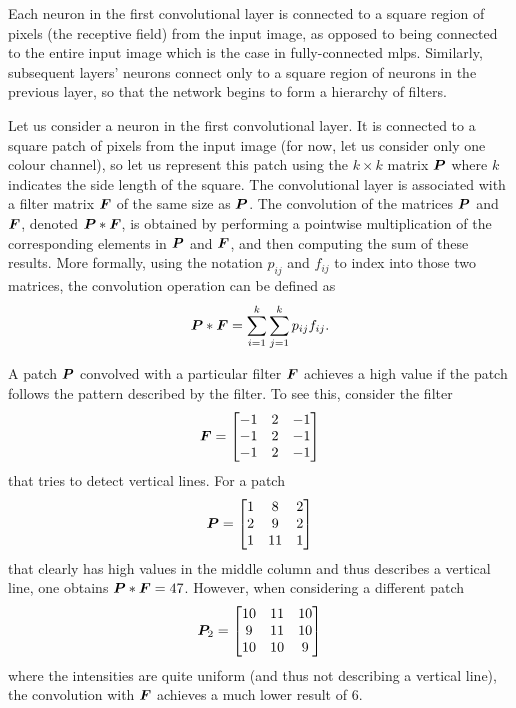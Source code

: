 \documentclass[../report.tex]{subfiles}
\begin{document}
Each neuron in the first convolutional layer is connected to a square region of pixels (the receptive field) from the input image, as opposed to being connected to the entire input image which is the case in fully-connected \glspl{mlp}.
Similarly, subsequent layers' neurons connect only to a square region of neurons in the previous layer, so that the network begins to form a hierarchy of filters.

Let us consider a neuron in the first convolutional layer.
It is connected to a square patch of pixels from the input image (for now, let us consider only one colour channel), so let us represent this patch using the $k\times k$ matrix ${\bm{P}}$ where $k$ indicates the side length of the square.
The convolutional layer is associated with a filter matrix ${\bm{F}}$ of the same size as ${\bm{P}}$.
The convolution of the matrices ${\bm{P}}$ and ${\bm{F}}$, denoted ${\bm{P}} * {\bm{F}}$, is obtained by performing a pointwise multiplication of the corresponding elements in ${\bm{P}}$ and ${\bm{F}}$, and then computing the sum of these results.
More formally, using the notation $p_{ij}$ and $f_{ij}$ to index into those two matrices, the convolution operation can be defined as
\begin{equation}
    {\bm{P}} * {\bm{F}} = \sum_{i=1}^k \sum_{j=1}^k p_{ij} f_{ij}.
\end{equation}

A patch ${\bm{P}}$ convolved with a particular filter ${\bm{F}}$ achieves a high value if the patch follows the pattern described by the filter.
To see this, consider the filter
\begin{equation*}
    {\bm{F}} = \begin{bmatrix}
        -1 & 2 & -1 \\
        -1 & 2 & -1 \\
        -1 & 2 & -1
    \end{bmatrix}
\end{equation*}
that tries to detect vertical lines.
For a patch
\begin{equation*}
    {\bm{P}} = \begin{bmatrix}
        1 & 8 & 2 \\
        2 & 9 & 2 \\
        1 & 11 & 1
    \end{bmatrix}
\end{equation*}
that clearly has high values in the middle column and thus describes a vertical line, 
one obtains ${\bm{P}} * {\bm{F}} = 47$. However, when considering a different patch
\begin{equation*}
    {\bm{P}}_2 = \begin{bmatrix}
        10 & 11 & 10 \\
        9 & 11 & 10 \\
        10 & 10 & 9
    \end{bmatrix}
\end{equation*}
where the intensities are quite uniform (and thus not describing a vertical line), the convolution with ${\bm{F}}$ achieves a much lower result of $6$.
\end{document}
